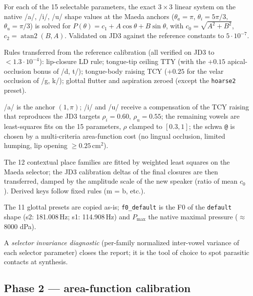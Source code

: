 \documentclass[11pt,a4paper]{article}
\newcommand{\code}[1]{\texttt{#1}}
\begin{document}
\begin{description}[leftmargin=2em]
\item[Stage 1 --- the COVTL plane (deterministic).] For each of the
  15 selectable parameters, the exact $3\times3$ linear system on the
  native /a/, /i/, /u/ shape values at the Maeda anchors
  ($\theta_a = \pi$, $\theta_i = 5\pi/3$, $\theta_u = \pi/3$) is
  solved for $P(\theta) = c_1 + A\cos\theta + B\sin\theta$, with
  $c_0 = \sqrt{A^2+B^2}$, $c_2 = \operatorname{atan2}(B,A)$.
  Validated on JD3 against the reference constants to
  $5\cdot10^{-7}$.
\item[Stage 2 --- closure and contact offsets.] Rules transferred
  from the reference calibration (all verified on JD3 to
  $<1.3\cdot10^{-4}$): lip-closure LD rule; tongue-tip ceiling TTY
  (with the $+0.15$ apical-occlusion bonus of /d, t/); tongue-body
  raising TCY ($+0.25$ for the velar occlusion of /g, k/); glottal
  flutter and aspiration zeroed (except the \code{hoarse2} preset).
\item[Stage 3 --- vowels.] /a/ is the anchor $(1, \pi)$; /i/ and /u/
  receive a compensation of the TCY raising that reproduces the JD3
  targets $\rho_i = 0.60$, $\rho_u = 0.55$; the remaining vowels are
  least-squares fits on the 15 parameters, $\rho$ clamped to
  $[0.3, 1]$; the schwa \code{@} is chosen by a multi-criteria
  area-function cost (no lingual occlusion, limited humping, lip
  opening $\ge 0.25$\,cm$^2$).
\item[Stage 4 --- consonants.] The 12 contextual place families are
  fitted by weighted least squares on the Maeda selector; the JD3
  calibration deltas of the final closures are then transferred,
  damped by the amplitude scale of the new speaker (ratio of mean
  $c_0$). Derived keys follow fixed rules (m = b, etc.).
\item[Stage 5 --- glottal source.] The 11 glottal presets are copied
  as-is; \texttt{f0\_default} is the F0 of the \code{default} shape
  (s2: 181.008\,Hz; s1: 114.908\,Hz) and $P_{\max}$ the native
  maximal pressure ($\approx$ 8000 dPa).
\end{description}

A \emph{selector invariance diagnostic} (per-family normalized
inter-vowel variance of each selector parameter) closes the report;
it is the tool of choice to spot parasitic contacts at synthesis.

\subsection{Phase 2 --- area-function calibration}
\end{document}
